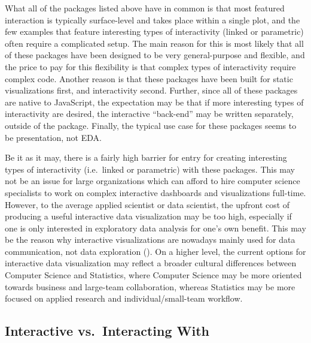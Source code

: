 \documentclass[
]{book}
\theoremstyle{definition}
\theoremstyle{definition}
\theoremstyle{definition}
\theoremstyle{definition}
\theoremstyle{remark}
\begin{document}
What all of the packages listed above have in common is that most featured interaction is typically surface-level and takes place within a single plot, and the few examples that feature interesting types of interactivity (linked or parametric) often require a complicated setup. The main reason for this is most likely that all of these packages have been designed to be very general-purpose and flexible, and the price to pay for this flexibility is that complex types of interactivity require complex code. Another reason is that these packages have been built for static visualizations first, and interactivity second. Further, since all of these packages are native to JavaScript, the expectation may be that if more interesting types of interactivity are desired, the interactive ``back-end'' may be written separately, outside of the package. Finally, the typical use case for these packages seems to be presentation, not EDA.

Be it as it may, there is a fairly high barrier for entry for creating interesting types of interactivity (i.e.~linked or parametric) with these packages. This may not be an issue for large organizations which can afford to hire computer science specialists to work on complex interactive dashboards and visualizations full-time. However, to the average applied scientist or data scientist, the upfront cost of producing a useful interactive data visualization may be too high, especially if one is only interested in exploratory data analysis for one's own benefit. This may be the reason why interactive visualizations are nowadays mainly used for data communication, not data exploration (). On a higher level, the current options for interactive data visualization may reflect a broader cultural differences between Computer Science and Statistics, where Computer Science may be more oriented towards business and large-team collaboration, whereas Statistics may be more focused on applied research and individual/small-team workflow.

\subsection{Interactive vs.~Interacting With}\label{interactive-vs.-interacting-with}
\end{document}

